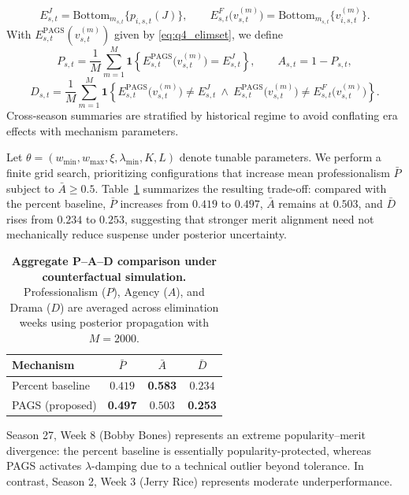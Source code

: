 \begin{equation}
E_{s,t}^{J}
=
\mathrm{Bottom}_{m_{s,t}}\{p_{i,s,t}(J)\},
\qquad
E_{s,t}^{F}\!\bigl(v^{(m)}_{s,t}\bigr)
=
\mathrm{Bottom}_{m_{s,t}}\{v_{i,s,t}^{(m)}\}.
\label{eq:q4_extremes}
\end{equation}
With $E_{s,t}^{\mathrm{PAGS}}(v^{(m)}_{s,t})$ given by \eqref{eq:q4_elimset}, we define
\begin{equation}
P_{s,t}
=
\frac{1}{M}\sum_{m=1}^{M}
\mathbf{1}\!\left\{
E_{s,t}^{\mathrm{PAGS}}\!\bigl(v^{(m)}_{s,t}\bigr)=E_{s,t}^{J}
\right\},
\qquad
A_{s,t}=1-P_{s,t},
\label{eq:q4_P_A}
\end{equation}
\begin{equation}
D_{s,t}
=
\frac{1}{M}\sum_{m=1}^{M}
\mathbf{1}\!\left\{
E_{s,t}^{\mathrm{PAGS}}\!\bigl(v^{(m)}_{s,t}\bigr)\neq E_{s,t}^{J}
\ \land\
E_{s,t}^{\mathrm{PAGS}}\!\bigl(v^{(m)}_{s,t}\bigr)\neq E_{s,t}^{F}\!\bigl(v^{(m)}_{s,t}\bigr)
\right\}.
\label{eq:q4_D}
\end{equation}
Cross-season summaries are stratified by historical regime to avoid conflating era effects with mechanism parameters.

Let $\theta=(w_{\min},w_{\max},\xi,\lambda_{\min},K,L)$ denote tunable parameters. We perform a finite grid search, prioritizing configurations that increase mean professionalism $\bar P$ subject to $\bar A\ge 0.5$. Table~\ref{tab:q4_pad} summarizes the resulting trade-off: compared with the percent baseline, $\bar P$ increases from $0.419$ to $0.497$, $\bar A$ remains at $0.503$, and $\bar D$ rises from $0.234$ to $0.253$, suggesting that stronger merit alignment need not mechanically reduce suspense under posterior uncertainty.


\begin{table}[t]
\centering
\caption{\textbf{Aggregate P--A--D comparison under counterfactual simulation.} Professionalism ($P$), Agency ($A$), and Drama ($D$) are averaged across elimination weeks using posterior propagation with $M=2000$.}
\label{tab:q4_pad}
\begin{tabular}{lccc}
\toprule
Mechanism & $\bar P$ & $\bar A$ & $\bar D$ \\
\midrule
Percent baseline & $0.419$ & \textbf{0.583}& $0.234$ \\
PAGS (proposed) & \textbf{0.497}& $0.503$ & \textbf{0.253}\\
\bottomrule
\end{tabular}
\end{table}

Season 27, Week 8 (Bobby Bones) represents an extreme popularity--merit divergence: the percent baseline is essentially popularity-protected, whereas PAGS activates $\lambda$-damping due to a technical outlier beyond tolerance. In contrast, Season 2, Week 3 (Jerry Rice) represents moderate underperformance.


